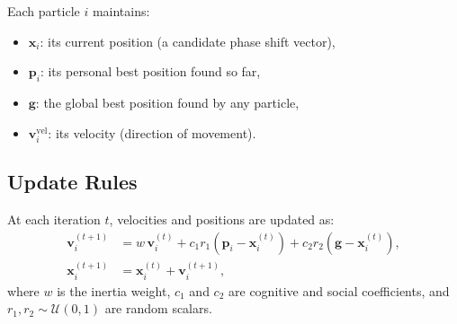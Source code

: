 \documentclass[12pt, a4paper]{article}
\newcommand{\vect}[1]{\mathbf{#1}}          %
\begin{document}
Each particle $i$ maintains:
\begin{itemize}
    \item $\vect{x}_i$: its current position (a candidate phase shift vector),
    \item $\vect{p}_i$: its personal best position found so far,
    \item $\vect{g}$: the global best position found by any particle,
    \item $\vect{v}_i^{\text{vel}}$: its velocity (direction of movement).
\end{itemize}

\subsection{Update Rules}
At each iteration $t$, velocities and positions are updated as:
\begin{align}
    \vect{v}_i^{(t+1)} &= w\,\vect{v}_i^{(t)}
        + c_1 r_1 \left(\vect{p}_i - \vect{x}_i^{(t)}\right)
        + c_2 r_2 \left(\vect{g}   - \vect{x}_i^{(t)}\right),
        \label{eq:pso_vel} \\
    \vect{x}_i^{(t+1)} &= \vect{x}_i^{(t)} + \vect{v}_i^{(t+1)},
        \label{eq:pso_pos}
\end{align}
where $w$ is the inertia weight, $c_1$ and $c_2$ are cognitive and social
coefficients, and $r_1, r_2 \sim \mathcal{U}(0,1)$ are random scalars.
\end{document}
